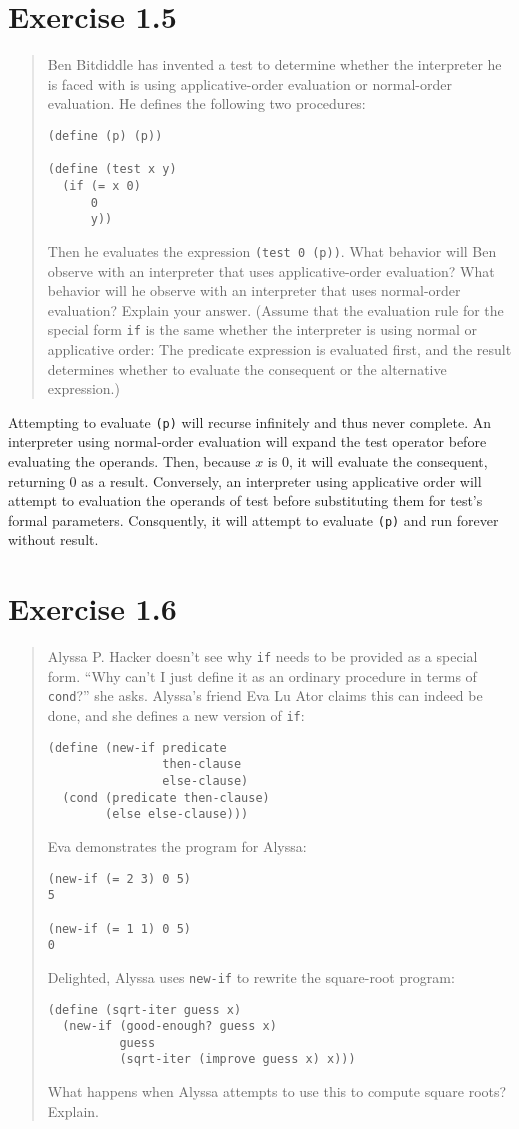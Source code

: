 \documentclass{article}
\begin{document}
\section{Exercise 1.5}
\begin{quote}
    Ben Bitdiddle has invented a test to determine whether the interpreter he is
    faced with is using applicative-order evaluation or normal-order evaluation.
    He defines the following two procedures:
    \begin{lstlisting}
(define (p) (p))

(define (test x y) 
  (if (= x 0) 
      0 
      y))
	\end{lstlisting}
	Then he evaluates the expression \verb|(test 0 (p))|. What behavior
	will Ben observe with an interpreter that uses applicative-order evaluation?
	What behavior will he observe with an interpreter that uses normal-order
	evaluation? Explain your answer. (Assume that the evaluation rule for the
	special form \verb|if| is the same whether the interpreter is using
	normal or applicative order: The predicate expression is evaluated first,
	and the result determines whether to evaluate the consequent or the
	alternative expression.)
\end{quote}

Attempting to evaluate \verb|(p)| will recurse infinitely and thus never
complete. An interpreter using normal-order evaluation will expand the test
operator before evaluating the operands. Then, because $x$ is 0, it will
evaluate the consequent, returning 0 as a result. Conversely, an interpreter
using applicative order will attempt to evaluation the operands of test before
substituting them for test's formal parameters. Consquently, it will attempt to
evaluate \verb|(p)| and run forever without result.

\section{Exercise 1.6}
\begin{quote}
    Alyssa P. Hacker doesn’t see why \verb|if| needs to be provided as a
    special form.  “Why can’t I just define it as an ordinary procedure in
    terms of \verb|cond|?” she asks. Alyssa’s friend Eva Lu Ator claims
    this can indeed be done, and she defines a new version of \verb|if|:
	\begin{lstlisting}
(define (new-if predicate 
                then-clause 
                else-clause)
  (cond (predicate then-clause)
        (else else-clause)))
	\end{lstlisting}
	Eva demonstrates the program for Alyssa:
	\begin{lstlisting}
(new-if (= 2 3) 0 5)
5

(new-if (= 1 1) 0 5)
0
	\end{lstlisting}
    Delighted, Alyssa uses \verb|new-if| to rewrite the square-root
    program:
	\begin{lstlisting}
(define (sqrt-iter guess x)
  (new-if (good-enough? guess x)
          guess
          (sqrt-iter (improve guess x) x)))
	\end{lstlisting}
	What happens when Alyssa attempts to use this to compute square roots?
	Explain.
\end{quote}
\end{document}
